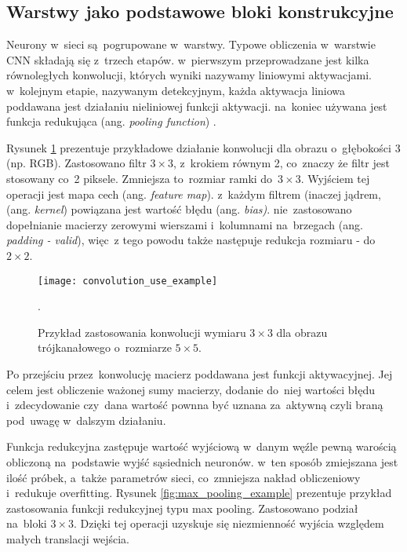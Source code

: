 \subsection{Warstwy jako podstawowe bloki konstrukcyjne}

Neurony w~sieci są~pogrupowane w~warstwy. Typowe obliczenia w~warstwie CNN składają się z~trzech etapów. w~pierwszym przeprowadzane jest kilka równoległych konwolucji, których wyniki nazywamy liniowymi aktywacjami. w~kolejnym etapie, nazywanym detekcyjnym, każda aktywacja liniowa poddawana jest działaniu nieliniowej funkcji aktywacji. na~koniec używana jest funkcja redukująca (ang. \textit{pooling function}) \cite{deep_learning}.

{\parindent0pt %
Rysunek \ref{fig:convolution_example} prezentuje przykładowe działanie konwolucji dla obrazu o~głębokości 3 (np. RGB). Zastosowano filtr $3\times3$, z~krokiem równym 2, co~znaczy że filtr jest stosowany co~2 piksele. Zmniejsza to~rozmiar ramki do~$3\times3$. Wyjściem tej operacji jest mapa cech (ang. \textit{feature map}). z~każdym filtrem (inaczej jądrem, (ang. \textit{kernel}) powiązana jest wartość błędu (ang. \textit{bias)}. nie~zastosowano dopełnianie macierzy zerowymi wierszami i~kolumnami na~brzegach (ang. \textit{padding - valid}), więc~z tego powodu także następuje redukcja rozmiaru - do~$2\times2$. 

\begin{figure}[h!]
	\centering
	\centering
		\texttt{[image: convolution\_use\_example]}	
	\caption{Przykład zastosowania konwolucji wymiaru $3\times3$ dla obrazu trójkanałowego o~rozmiarze $5\times5$.}.
	\label{fig:convolution_example}
\end{figure}

Po przejściu przez~konwolucję macierz poddawana jest funkcji aktywacyjnej. Jej celem jest obliczenie ważonej sumy macierzy, dodanie do~niej wartości błędu i~zdecydowanie czy~dana wartość pownna być uznana za~aktywną czyli braną pod~uwagę w~dalszym działaniu.

Funkcja redukcyjna zastępuje wartość wyjściową w~danym węźle pewną warością obliczoną na~podstawie wyjść sąsiednich neuronów. w~ten sposób zmiejszana jest ilość próbek, a~także parametrów sieci, co~zmniejsza nakład obliczeniowy i~redukuje overfitting. Rysunek \ref{fig:max_pooling_example} prezentuje przykład zastosowania funkcji redukcyjnej typu max pooling. Zastosowano podział na~bloki $3\times3$. Dzięki tej operacji uzyskuje się niezmienność wyjścia względem małych translacji wejścia.

}
